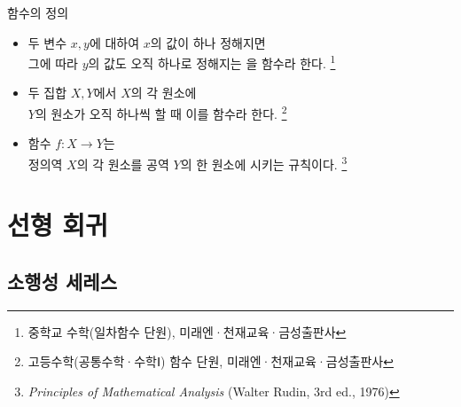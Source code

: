 \documentclass{beamer}
\theoremstyle{definition}
\numberwithin{theorem}{section}
\begin{document}
\begin{frame}{함수의 정의}

\begin{itemize}\setlength{\itemsep}{9pt}

    \item[1.] 두 변수 \(x, y\)에 대하여 \(x\)의 값이 하나 정해지면\\
    그에 따라 \(y\)의 값도 오직 하나로 정해지는 {\color{Sogang}{대응}}을 함수라 한다.
    \footnote{중학교 수학(일차함수 단원), 미래엔·천재교육·금성출판사}

    \item[2.] 두 집합 \(X, Y\)에서 \(X\)의 각 원소에\\
    \(Y\)의 원소가 오직 하나씩 {\color{Sogang}{대응}}할 때 이를 함수라 한다.
    \footnote{고등수학(공통수학·수학Ⅰ) 함수 단원, 미래엔·천재교육·금성출판사}

    \item[3.] 함수 \(f : X \to Y\)는\\
    정의역 \(X\)의 각 원소를 공역 \(Y\)의 한 원소에 {\color{Sogang}{대응}}시키는 규칙이다.
    \footnote{\textit{Principles of Mathematical Analysis} (Walter Rudin, 3rd ed., 1976)}

\end{itemize}

\end{frame}


\section{선형 회귀}


\subsection{소행성 세레스}
\end{document}
